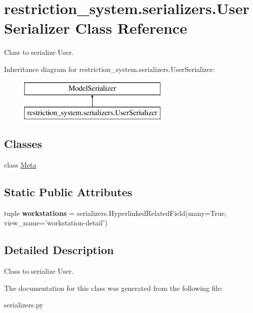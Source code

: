 \hypertarget{classrestriction__system_1_1serializers_1_1UserSerializer}{}\section{restriction\+\_\+system.\+serializers.\+User\+Serializer Class Reference}
\label{classrestriction__system_1_1serializers_1_1UserSerializer}


Class to serialize User.  


Inheritance diagram for restriction\+\_\+system.\+serializers.\+User\+Serializer\+:\begin{figure}[H]
\begin{center}
\leavevmode
\includegraphics[height=2.000000cm]{classrestriction__system_1_1serializers_1_1UserSerializer}
\end{center}
\end{figure}
\subsection*{Classes}
\begin{DoxyCompactItemize}
\item 
class \hyperlink{classrestriction__system_1_1serializers_1_1UserSerializer_1_1Meta}{Meta}
\end{DoxyCompactItemize}
\subsection*{Static Public Attributes}
\begin{DoxyCompactItemize}
\item 
\hypertarget{classrestriction__system_1_1serializers_1_1UserSerializer_a01ba6b7b61a79b526e41413d6411f8de}{}tuple {\bfseries workstations} = serializers.\+Hyperlinked\+Related\+Field(many=True, view\+\_\+name='workstation-\/detail')\label{classrestriction__system_1_1serializers_1_1UserSerializer_a01ba6b7b61a79b526e41413d6411f8de}

\end{DoxyCompactItemize}


\subsection{Detailed Description}
Class to serialize User. 

The documentation for this class was generated from the following file\+:\begin{DoxyCompactItemize}
\item 
serializers.\+py\end{DoxyCompactItemize}
